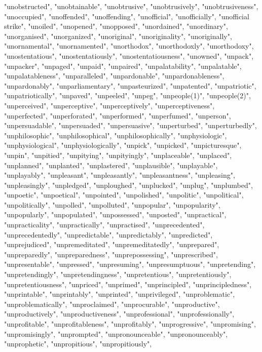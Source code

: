 "unobstructed",
"unobtainable",
"unobtrusive",
"unobtrusively",
"unobtrusiveness",
"unoccupied",
"unoffended",
"unoffending",
"unofficial",
"unofficially",
"unofficial strike",
"unoiled",
"unopened",
"unopposed",
"unordained",
"unordinary",
"unorganised",
"unorganized",
"unoriginal",
"unoriginality",
"unoriginally",
"unornamental",
"unornamented",
"unorthodox",
"unorthodoxly",
"unorthodoxy",
"unostentatious",
"unostentatiously",
"unostentatiousness",
"unowned",
"unpack",
"unpacker",
"unpaged",
"unpaid",
"unpaired",
"unpalatability",
"unpalatable",
"unpalatableness",
"unparalleled",
"unpardonable",
"unpardonableness",
"unpardonably",
"unparliamentary",
"unpasteurized",
"unpatented",
"unpatriotic",
"unpatriotically",
"unpaved",
"unpeeled",
"unpeg",
"unpeople(1)",
"unpeople(2)",
"unperceived",
"unperceptive",
"unperceptively",
"unperceptiveness",
"unperfected",
"unperforated",
"unperformed",
"unperfumed",
"unperson",
"unpersuadable",
"unpersuaded",
"unpersuasive",
"unperturbed",
"unperturbedly",
"unphilosophic",
"unphilosophical",
"unphilosophically",
"unphysiologic",
"unphysiological",
"unphysiologically",
"unpick",
"unpicked",
"unpicturesque",
"unpin",
"unpitied",
"unpitying",
"unpityingly",
"unplaceable",
"unplaced",
"unplanned",
"unplanted",
"unplastered",
"unplausible",
"unplayable",
"unplayably",
"unpleasant",
"unpleasantly",
"unpleasantness",
"unpleasing",
"unpleasingly",
"unpledged",
"unploughed",
"unplucked",
"unplug",
"unplumbed",
"unpoetic",
"unpoetical",
"unpointed",
"unpolished",
"unpolitic",
"unpolitical",
"unpolitically",
"unpolled",
"unpolluted",
"unpopular",
"unpopularity",
"unpopularly",
"unpopulated",
"unpossessed",
"unposted",
"unpractical",
"unpracticality",
"unpractically",
"unpractised",
"unprecedented",
"unprecedentedly",
"unpredictable",
"unpredictably",
"unpredicted",
"unprejudiced",
"unpremeditated",
"unpremeditatedly",
"unprepared",
"unpreparedly",
"unpreparedness",
"unprepossessing",
"unprescribed",
"unpresentable",
"unpressed",
"unpresuming",
"unpresumptuous",
"unpretending",
"unpretendingly",
"unpretendingness",
"unpretentious",
"unpretentiously",
"unpretentiousness",
"unpriced",
"unprimed",
"unprincipled",
"unprincipledness",
"unprintable",
"unprintably",
"unprinted",
"unprivileged",
"unproblematic",
"unproblematically",
"unproclaimed",
"unprocurable",
"unproductive",
"unproductively",
"unproductiveness",
"unprofessional",
"unprofessionally",
"unprofitable",
"unprofitableness",
"unprofitably",
"unprogressive",
"unpromising",
"unpromisingly",
"unprompted",
"unpronounceable",
"unpronounceably",
"unprophetic",
"unpropitious",
"unpropitiously",
